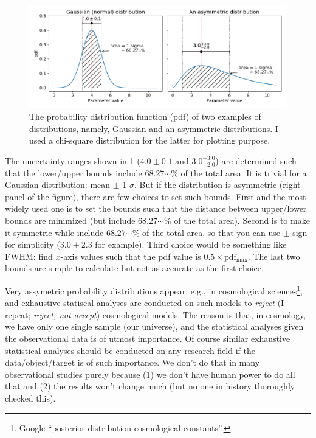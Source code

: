 \begin{figure}[ht!]
\centering
\includegraphics[width=1\linewidth]{figs/fig_posterior01}
\caption{The probability distribution function (pdf) of two examples of distributions, namely, Gaussian and an asymmetric distributions. I used a chi-square distribution for the latter for plotting purpose.}
\label{fig:figposterior01}
\end{figure}


The uncertainty ranges shown in \cref{fig:figposterior01} ($ 4.0 \pm 0.1 $ and $ 3.0^{+3.0}_{-2.0} $) are determined such that the lower/upper bounds include $ 68.27 \cdots \% $ of the total area. It is trivial for a Gaussian distribution: mean $ \pm $ 1-$ \sigma $. But if the distribution is asymmetric (right panel of the figure), there are few choices to set such bounds. First and the most widely used one is to set the bounds such that the distance between upper/lower bounds are minimized (but include $ 68.27 \cdots \% $ of the total area). Second is to make it symmetric while include $ 68.27 \cdots \% $ of the total area, so that you can use $ \pm $ sign for simplicity ($ 3.0 \pm 2.3 $ for example). Third choice would be something like FWHM: find $ x $-axis values such that the pdf value is $ 0.5 \times \mathrm{pdf_{max}} $. The last two bounds are simple to calculate but not as accurate as the first choice.

Very assymetric probability distributions appear, e.g., in cosmological sciences\footnote{Google ``posterior distribution cosmological constants''.}, and exhaustive statiscal analyses are conducted on such models to \textit{reject} (I repeat; \textit{reject, not accept}) cosmological models. The reason is that, in cosmology, we have only one single sample (our universe), and the statistical analyses given the observational data is of utmost importance. Of course similar exhaustive statistical analyses should be conducted on any research field if the data/object/target is of such importance. We don't do that in many observational studies purely because (1) we don't have human power to do all that and (2) the results won't change much (but no one in history thoroughly checked this).



